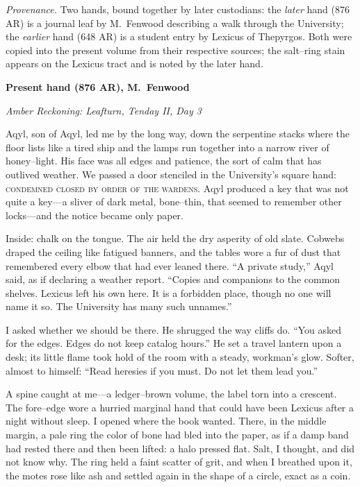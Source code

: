 \documentclass[11pt]{article}
\begin{document}
\noindent\textit{Provenance.} Two hands, bound together by later custodians: the \emph{later} hand (876 AR) is a journal leaf by M.\ Fenwood describing a walk through the University; the \emph{earlier} hand (648 AR) is a student entry by Lexicus of Thepyrgos. Both were copied into the present volume from their respective sources; the salt–ring stain appears on the Lexicus tract and is noted by the later hand.

\medskip
\noindent\textbf{Present hand (876 AR), M.\ Fenwood}

\noindent\textit{Amber Reckoning: Leafturn, Tenday II, Day 3}

Aqyl, son of Aqyl, led me by the long way, down the serpentine stacks where the floor lists like a tired ship and the lamps run together into a narrow river of honey–light. His face was all edges and patience, the sort of calm that has outlived weather. We passed a door stenciled in the University’s square hand: \textsc{condemned \textemdash{} closed by order of the wardens}. Aqyl produced a key that was not quite a key—a sliver of dark metal, bone–thin, that seemed to remember other locks—and the notice became only paper.

Inside: chalk on the tongue. The air held the dry asperity of old slate. Cobwebs draped the ceiling like fatigued banners, and the tables wore a fur of dust that remembered every elbow that had ever leaned there. “A private study,” Aqyl said, as if declaring a weather report. “Copies and companions to the common shelves. Lexicus left his own here. It is a forbidden place, though no one will name it so. The University has many such unnames.”

I asked whether we should be there. He shrugged the way cliffs do. “You asked for the edges. Edges do not keep catalog hours.” He set a travel lantern upon a desk; its little flame took hold of the room with a steady, workman’s glow. Softer, almost to himself: “Read heresies if you must. Do not let them lead you.”

A spine caught at me—a ledger–brown volume, the label torn into a crescent. The fore–edge wore a hurried marginal hand that could have been Lexicus after a night without sleep. I opened where the book wanted. There, in the middle margin, a pale ring the color of bone had bled into the paper, as if a damp band had rested there and then been lifted: a halo pressed flat. Salt, I thought, and did not know why. The ring held a faint scatter of grit, and when I breathed upon it, the motes rose like ash and settled again in the shape of a circle, exact as a coin.
\end{document}
